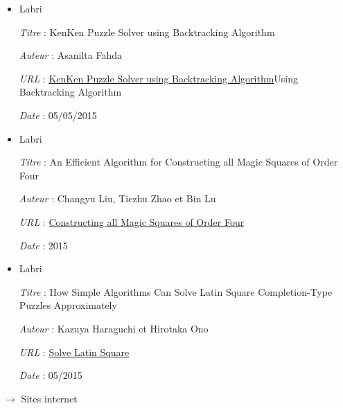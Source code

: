 \documentclass[1]{report}
\begin{document}
    \begin{itemize}

        \item Labri

        		\emph{Titre} : KenKen Puzzle Solver using Backtracking Algorithm

        		\emph{Auteur} : Asanilta Fahda

        		\emph{URL} : \href{http://www.labri.fr/perso/fleury/courses/pdp/Puzzle_Games/KenKen/KenKen_Puzzle_Solver_using_Backtracking_Algorithm.pdf}{KenKen Puzzle Solver using Backtracking Algorithm}{Using Backtracking Algorithm}



        		\emph{Date} : 05/05/2015 \\

		\item Labri

				\emph{Titre} : An Efficient Algorithm for Constructing all Magic Squares of Order Four

				\emph{Auteur} : Changyu Liu, Tiezhu Zhao et Bin Lu

				\emph{URL} : \href{http://www.labri.fr/perso/fleury/courses/pdp/Puzzle_Games/KenKen/23.pdf}{Constructing all Magic Squares of Order Four}



				\emph{Date} : 2015 \\

		\item Labri

				\emph{Titre} : How Simple Algorithms Can Solve Latin Square Completion-Type Puzzles Approximately

				\emph{Auteur} : Kazuya Haraguchi et Hirotaka Ono

				\emph{URL} : \href{http://www.labri.fr/perso/fleury/courses/pdp/Puzzle_Games/KenKen/23_276.pdf}{Solve Latin Square}



				\emph{Date} : 05/2015 \\

    \end{itemize}

    $\rightarrow$ Sites internet \\
\end{document}
